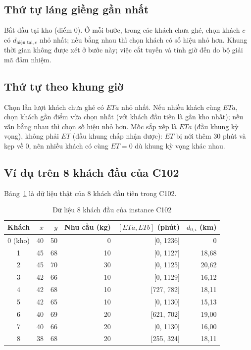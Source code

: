 \subsection{Thứ tự láng giềng gần nhất}

Bắt đầu tại kho (điểm 0). Ở mỗi bước, trong các khách chưa ghé, chọn khách $c$ có $d_{\text{hiện tại},c}$
nhỏ nhất; nếu bằng nhau thì chọn khách có số hiệu nhỏ hơn. Khung thời gian không được xét ở bước này;
việc cắt tuyến và tính giờ đến do bộ giải mã đảm nhiệm.

\subsection{Thứ tự theo khung giờ}

Chọn lần lượt khách chưa ghé có $ETa$ nhỏ nhất. Nếu nhiều khách cùng $ETa$, chọn khách gần điểm vừa chọn
nhất (với khách đầu tiên là gần kho nhất); nếu vẫn bằng nhau thì chọn số hiệu nhỏ hơn. Mốc sắp xếp là
$ETa$ (đầu khung kỳ vọng), không phải $ET$ (đầu khung chấp nhận được): $ET$ bị nới thêm 30 phút và kẹp
về 0, nên nhiều khách có cùng $ET = 0$ dù khung kỳ vọng khác nhau.

\subsection{Ví dụ trên 8 khách đầu của C102}

Bảng~\ref{tab:c102-8} là dữ liệu thật của 8 khách đầu tiên trong C102.

\begin{table}[H]
\centering
\caption{Dữ liệu 8 khách đầu của instance C102}
\label{tab:c102-8}
\begin{tabular}{@{}crrrrr@{}}
\toprule
Khách & $x$ & $y$ & Nhu cầu (kg) & $[ETa, LTb]$ (phút) & $d_{0,i}$ (km) \\
\midrule
0 (kho) & 40 & 50 & 0 & [0, 1236] & 0 \\
1 & 45 & 68 & 10 & [0, 1127] & 18,68 \\
2 & 45 & 70 & 30 & [0, 1125] & 20,62 \\
3 & 42 & 66 & 10 & [0, 1129] & 16,12 \\
4 & 42 & 68 & 10 & [727, 782] & 18,11 \\
5 & 42 & 65 & 10 & [0, 1130] & 15,13 \\
6 & 40 & 69 & 20 & [621, 702] & 19,00 \\
7 & 40 & 66 & 20 & [0, 1130] & 16,00 \\
8 & 38 & 68 & 20 & [255, 324] & 18,11 \\
\bottomrule
\end{tabular}
\end{table}

